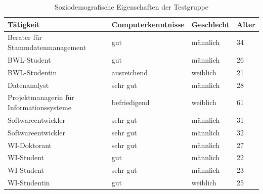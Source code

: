 \documentclass[
  language=german, %
  type=bachelor,%
  ngerman
]{isthesis}
\begin{document}
\begin{content}
  \begin{table}[]
    \footnotesize
    \begin{tabular}{l l l l}
      Tätigkeit & Computerkenntnisse & Geschlecht & Alter \\
      \toprule
      Berater für Stammdatenmanagement & gut & männlich & 34 \\
      \acrshort{BWL}-Student & gut & männlich & 26 \\
      \acrshort{BWL}-Studentin & ausreichend & weiblich & 21 \\
      Datenanalyst & sehr gut & männlich & 28 \\
      Projektmanagerin für Informationssysteme & befriedigend & weiblich & 61\\
      Softwareentwickler & sehr gut & männlich & 31 \\
      Softwareentwickler & sehr gut & männlich & 32 \\
      \acrshort{WI}-Doktorant & sehr gut & männlich & 27 \\
      \acrshort{WI}-Student & gut & männlich & 22 \\
      \acrshort{WI}-Student & sehr gut & männlich & 23 \\
      \acrshort{WI}-Studentin & gut & weiblich & 25 \\
    \end{tabular}
    \caption{Soziodemografische Eigenschaften der Testgruppe}\label{table:testgruppe}
  \end{table}


\end{content}
\end{document}
